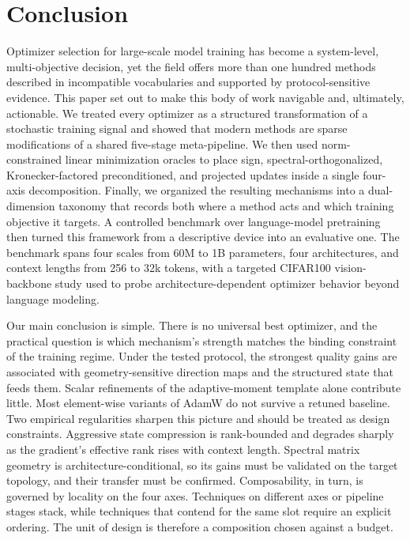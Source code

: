 \section{Conclusion}
\label{sec:conclusion}

Optimizer selection for large-scale model training has become a system-level,
multi-objective decision, yet the field offers more than one hundred methods
described in incompatible vocabularies and supported by protocol-sensitive
evidence. This paper set out to make this body of work navigable and, ultimately,
actionable. We treated every optimizer as a structured transformation of a
stochastic training signal and showed that modern methods are sparse
modifications of a shared five-stage meta-pipeline. We then used norm-constrained linear minimization oracles to place sign,
spectral-orthogonalized,
Kronecker-factored preconditioned, and projected updates inside a single four-axis
decomposition. Finally, we organized the resulting mechanisms into a
dual-dimension taxonomy that records both where a method acts and which training
objective it targets. A controlled benchmark over language-model pretraining
then turned this framework from a descriptive device into an evaluative one. The benchmark spans four scales from 60M to 1B parameters, four architectures,
and context lengths from 256 to 32k tokens, with a targeted CIFAR100
vision-backbone study used to probe architecture-dependent optimizer behavior
beyond language modeling.

Our main conclusion is simple. There is no universal best optimizer, and the
practical question is which mechanism's strength matches the binding constraint
of the training regime. Under the
tested protocol, the strongest quality gains are associated with
geometry-sensitive direction maps and the structured state that feeds them.
Scalar refinements of the adaptive-moment template alone contribute little. Most
element-wise variants of AdamW do not survive a retuned baseline. Two empirical
regularities sharpen this picture and should be treated as design constraints.
Aggressive state compression is rank-bounded and
degrades sharply as the gradient's effective rank rises with context length.
Spectral matrix geometry is architecture-conditional, so its gains must be
validated on the target topology, and their transfer must be confirmed.
Composability, in turn, is governed by locality on the four axes. Techniques on
different axes or pipeline stages stack, while techniques that contend for the
same slot require an explicit ordering. The unit of design is therefore a
composition chosen against a budget.

